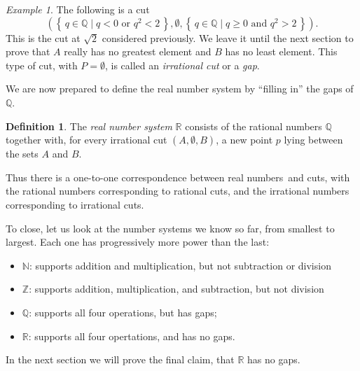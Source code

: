 \documentclass[11pt,oneside]{amsbook}
\newcommand{\set}[1]{\left\{\,#1\,\right\}}
\newcommand{\N}{\mathbb N}
\newcommand{\Z}{\mathbb Z}
\newcommand{\Q}{\mathbb Q}
\newcommand{\R}{\mathbb R}
\theoremstyle{definition}
\theoremstyle{plain}
\theoremstyle{definition}
\newtheorem{definition}[theorem]{Definition}
\theoremstyle{remark}
\newtheorem{example}[theorem]{Example}
\numberwithin{equation}{section}
\numberwithin{figure}{section}
\begin{document}
\begin{example}
  The following is a cut
  \begin{equation}
    \label{eq:irrationalcut}
    \left(\set{q\in\Q\mid q<0\text{ or }q^2<2},\emptyset,\set{q\in\Q\mid q\geq0\text{ and }q^2>2}\right)\text{.}
  \end{equation}
  This is the cut at $\sqrt{2}$ considered previously. We leave it until the next section to prove that $A$ really has no greatest element and $B$ has no least element. This type of cut, with $P=\emptyset$, is called an \emph{irrational cut} or a \emph{gap}.
  
  \begin{center}
  \end{center}
\end{example}

We are now prepared to define the real number system by ``filling in'' the gaps of $\Q$.

\begin{definition}
  The \emph{real number system} $\R$ consists of the rational numbers $\Q$ together with, for every irrational cut $(A,\emptyset,B)$, a new point $p$ lying between the sets $A$ and $B$.
\end{definition}

Thus there is a one-to-one correspondence between real numbers and cuts, with the rational numbers corresponding to rational cuts, and the irrational numbers corresponding to irrational cuts.

To close, let us look at the number systems we know so far, from smallest to largest. Each one has progressively more power than the last:
\begin{itemize}
  \item $\N$: supports addition and multiplication, but not subtraction or division
  \item $\Z$: supports addition, multiplication, and subtraction, but not division
  \item $\Q$: supports all four operations, but has gaps;
  \item $\R$: supports all four opertations, and has no gaps.
\end{itemize}
In the next section we will prove the final claim, that $\R$ has no gaps.
\end{document}
